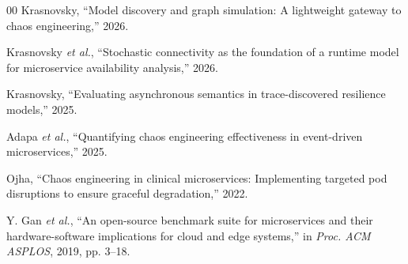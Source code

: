 \documentclass[conference]{IEEEtran}
\begin{document}
\begin{thebibliography}{00}
Krasnovsky, ``Model discovery and graph simulation: A lightweight gateway to chaos engineering,'' 2026.

Krasnovsky \textit{et al.}, ``Stochastic connectivity as the foundation of a runtime model for microservice availability analysis,'' 2026.

Krasnovsky, ``Evaluating asynchronous semantics in trace-discovered resilience models,'' 2025.

Adapa \textit{et al.}, ``Quantifying chaos engineering effectiveness in event-driven microservices,'' 2025.

Ojha, ``Chaos engineering in clinical microservices: Implementing targeted pod disruptions to ensure graceful degradation,'' 2022.

Y. Gan \textit{et al.}, ``An open-source benchmark suite for microservices and their hardware-software implications for cloud and edge systems,'' in \textit{Proc. ACM ASPLOS}, 2019, pp. 3--18.

\end{thebibliography}
\end{document}
